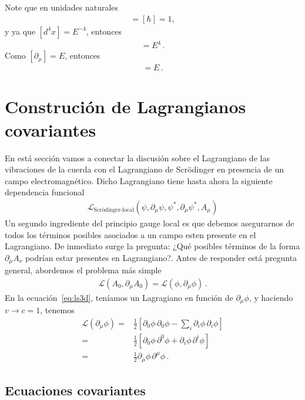 Note que en unidades naturales
\begin{align}
  [S]=[\hbar]=1,
\end{align}
y ya que $[d^4x]=E^{-4}$, entonces
\begin{align}
  [\mathcal{L}]=E^{4}\,.
\end{align}
Como $[\partial_{\mu}]=E$, entonces
\begin{align}
  [\phi]=E\,.
\end{align}

 

\section{Construción de Lagrangianos covariantes}

En está sección vamos a conectar la discusión sobre el Lagrangiano de las vibraciones de la cuerda con el Lagrangiano de Scr\"odinger en presencia de un campo electromagnético. Dicho Lagrangiano tiene hasta ahora la siguiente dependencia funcional
\begin{align*}
  \mathcal{L}_{\text{Scrödinger-local}}(\psi,\partial_{\mu}\psi,\psi^{*},\partial_{\mu}\psi^{*},A_{\mu})
\end{align*}
Un segundo ingrediente del principio gauge local es que debemos asegurarnos de todos los términos posibles asociados a un campo esten presente en el Lagrangiano. De inmediato surge la pregunta: ¿Qué posibles términos de la forma $\partial_{\mu}A_{\nu}$ podrían estar presentes en Lagrangiano?. Antes de responder está pregunta general, abordemos el problema más simple
\begin{align*}
  \mathcal{L}(A_0,\partial_\mu A_0)=  \mathcal{L}(\phi,\partial_\mu \phi)\,.
\end{align*}
En la ecuación~\eqref{eq:ls3d}, teníamos un Lagragiano en función de $\partial_{\mu}\phi$, y haciendo $v\to c=1$, tenemos
\begin{align*}
  \mathcal{L}(\partial_{\mu}\phi)
    =&\frac{1}{2}\left[
      {\partial_0\phi}\,{\partial_0\phi}-\sum_i{\partial_i\phi}\,{\partial_i\phi}
   \right]\nonumber\\
    =&\frac{1}{2}\left[
      {\partial_0\phi}\,{\partial^0\phi}+{\partial_i\phi}\,{\partial^i\phi}
   \right]\nonumber\\
   =&\frac{1}{2}{\partial_\mu\phi}\,{\partial^\mu\phi}\,.
\end{align*}



\subsection{Ecuaciones covariantes}
\label{sec:ecuac-covar}



